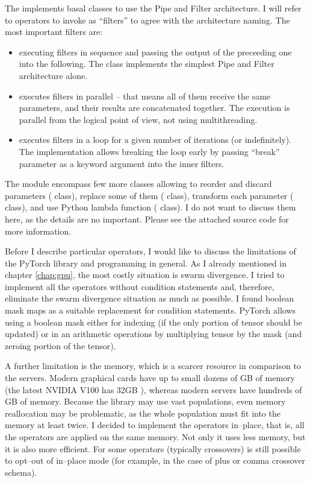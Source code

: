 The  implements basal classes to use the Pipe and Filter architecture. I will refer to operators to invoke as \enquote{filters} to agree with the architecture naming. The most important filters are:
\begin{itemize}
    \item {} executing filters in sequence and passing the output of the preceeding one into the following. The  class implements the simplest Pipe and Filter architecture alone.
    \item {} executes filters in parallel -- that means all of them receive the same parameters, and their results are concatenated together. The execution is parallel from the logical point of view, not using multithreading.
    \item {} executes filters in a loop for a given number of iterations (or indefinitely). The implementation allows breaking the loop early by passing \enquote{break} parameter as a keyword argument into the inner filters.
\end{itemize}
The module encompass few more classes allowing to reorder and discard parameters ( class), replace some of them ( class), transform each parameter ( class), and use Python lambda function ( class). I do not want to discuss them here, as the details are no important. Please see the attached source code for more information.

Before I describe particular operators, I would like to discuss the limitations of the PyTorch library and \gpu programming in general. As I already mentioned in chapter \ref{chap:gpu}, the most costly situation is swarm divergence. I tried to implement all the operators without condition statements and, therefore, eliminate the swarm divergence situation as much as possible. I found boolean mask maps as a suitable replacement for condition statements. PyTorch allows using a boolean mask either for indexing (if the only portion of tensor should be updated) or in an arithmetic operations by multiplying tensor by the mask (and zeroing portion of the tensor).

A further limitation is the \gpu memory, which is a scarcer resource in comparison to the servers. Modern graphical cards have up to small dozens of GB of memory (the latest NVIDIA V100 has 32GB \citep{nvidiav100spec}), whereas modern servers have hundreds of GB of memory. Because the library may use vast populations, even memory reallocation may be problematic, as the whole population must fit into the memory at least twice. I decided to implement the operators in--place, that is, all the operators are applied on the same memory. Not only it uses less memory, but it is also more efficient. For some operators (typically crossovers) is still possible to opt--out of in--place mode (for example, in the case of plus or comma crossover schema).

